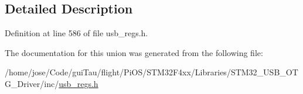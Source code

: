 \subsection{Detailed Description}


Definition at line 586 of file usb\-\_\-regs.\-h.



The documentation for this union was generated from the following file\-:\begin{DoxyCompactItemize}
\item 
/home/jose/\-Code/gui\-Tau/flight/\-Pi\-O\-S/\-S\-T\-M32\-F4xx/\-Libraries/\-S\-T\-M32\-\_\-\-U\-S\-B\-\_\-\-O\-T\-G\-\_\-\-Driver/inc/\hyperlink{_s_t_m32_f4xx_2_libraries_2_s_t_m32___u_s_b___o_t_g___driver_2inc_2usb__regs_8h}{usb\-\_\-regs.\-h}\end{DoxyCompactItemize}
